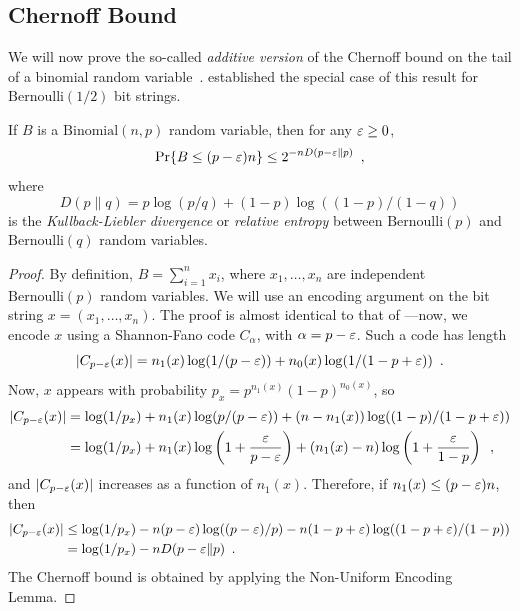 \documentclass{patmorin}
\begin{document}
\subsection{Chernoff Bound}

We will now prove the so-called \emph{additive version} of the
Chernoff bound on the tail of a binomial random
variable~\cite{chernoff:bound}.  established
the special case of this result for $\mathrm{Bernoulli}(1/2)$ bit
strings.

\begin{thm}
  If $B$ is a $\mathrm{Binomial}(n,p)$ random variable, then for any
  $\varepsilon \geq 0$,
  \[
    \Pr\{B\le(p-\varepsilon)n\} \le 2^{-nD(p-\varepsilon \| p)} \enspace ,
  \]
  where 
  \[ 
    D(p \| q)= p\log (p/q) + (1-p)\log ((1 - p)/(1 - q))
  \]
  is the \emph{Kullback-Liebler divergence} or \emph{relative entropy}
  between $\mathrm{Bernoulli}(p)$ and $\mathrm{Bernoulli}(q)$ random
  variables.
\end{thm}

\begin{proof}
  By definition, $B=\sum_{i=1}^n x_i$, where $x_1,\ldots,x_n$ are
  independent $\mathrm{Bernoulli}(p)$ random variables.  We will use
  an encoding argument on the bit string $x=(x_1,\ldots,x_n)$. The
  proof is almost identical to that of ---now,
  we encode $x$ using a Shannon-Fano code $C_\alpha$, with
  $\alpha = p - \varepsilon$. Such a code has length
  \[
    |C_{p - \varepsilon}(x)| = n_1(x) \log (1/(p - \varepsilon)) + n_0(x) \log (1/(1
    - p + \varepsilon)) \enspace .
  \]
  Now, $x$ appears with probability
  $p_x = p^{n_1(x)} (1 - p)^{n_0(x)}$, so
  \begin{align*}
    |C_{p - \varepsilon}(x)| &= \log(1/p_x) + n_1(x) \log (p/(p - \varepsilon)) + (n - n_1(x)) \log ((1 - p)/(1 - p + \varepsilon)) \\
                      &= \log (1/p_x) + n_1(x) \log \left(1 + \frac{\varepsilon}{p - \varepsilon}\right) + (n_1(x) - n) \log \left(1 + \frac{\varepsilon}{1 - p}\right) \enspace ,
  \end{align*}
  and $|C_{p - \varepsilon}(x)|$ increases as a function of
  $n_1(x)$. Therefore, if $n_1(x) \le (p - \varepsilon)n$, then
  \begin{align*}
    |C_{p - \varepsilon}(x)| &\le \log (1/p_x) - n (p - \varepsilon) \log ((p - \varepsilon)/p) - n (1 - p + \varepsilon) \log ((1 - p + \varepsilon)/(1 - p)) \\
                      &= \log (1/p_x) - n D(p - \varepsilon \| p) \enspace .
  \end{align*}
  The Chernoff bound is obtained by applying the Non-Uniform Encoding
  Lemma.
\end{proof}
\end{document}
